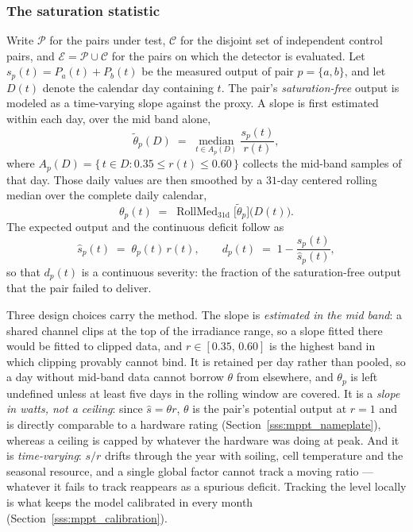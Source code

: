 \subsubsection{The saturation statistic}
\label{sss:mppt_stat}

Write $\mathcal{P}$ for the pairs under test, $\mathcal{C}$ for the disjoint set of independent control pairs, and $\mathcal{E} = \mathcal{P} \cup \mathcal{C}$ for the pairs on which the detector is evaluated. Let $s_p(t) = P_a(t) + P_b(t)$ be the measured output of pair $p = \{a,b\}$, and let $D(t)$ denote the calendar day containing $t$. The pair's \emph{saturation-free} output is modeled as a time-varying slope against the proxy. A slope is first estimated within each day, over the mid band alone,
%
\begin{equation}
\tilde\theta_p(D) \;=\; \operatorname*{median}_{t \in A_p(D)} \frac{s_p(t)}{r(t)},
  \label{eq:mppt_theta_day}
\end{equation}
%
where $A_p(D) = \{\, t \in D : 0.35 \le r(t) \le 0.60 \,\}$ collects the mid-band samples of that day. Those daily values are then smoothed by a $31$-day centered rolling median over the complete daily calendar,
%
\begin{equation}
\theta_p(t) \;=\; \operatorname{RollMed}_{31\mathrm{d}} \big[\tilde\theta_p\big]\big(D(t)\big).
  \label{eq:mppt_theta}
\end{equation}
%
The expected output and the continuous deficit follow as
%
\begin{equation}
\widehat{s}_p(t) \;=\; \theta_p(t)\, r(t), \qquad d_p(t) \;=\; 1 - \frac{s_p(t)}{\widehat{s}_p(t)} ,
  \label{eq:mppt_deficit}
\end{equation}
%
so that $d_p(t)$ is a continuous severity: the fraction of the saturation-free output that the pair failed to deliver.

Three design choices carry the method. The slope is \emph{estimated in the mid band}: a shared channel clips at the top of the irradiance range, so a slope fitted there would be fitted to clipped data, and $r \in [0.35,\,0.60]$ is the highest band in which clipping provably cannot bind. It is retained per day rather than pooled, so a day without mid-band data cannot borrow $\theta$ from elsewhere, and $\theta_p$ is left undefined unless at least five days in the rolling window are covered. It is a \emph{slope in watts, not a ceiling}: since $\widehat{s} = \theta r$, $\theta$ is the pair's potential output at $r = 1$ and is directly comparable to a hardware rating (Section~\ref{sss:mppt_nameplate}), whereas a ceiling is capped by whatever the hardware was doing at peak. And it is \emph{time-varying}: $s/r$ drifts through the year with soiling, cell temperature and the seasonal resource, and a single global factor cannot track a moving ratio --- whatever it fails to track reappears as a spurious deficit. Tracking the level locally is what keeps the model calibrated in every month (Section~\ref{sss:mppt_calibration}).

